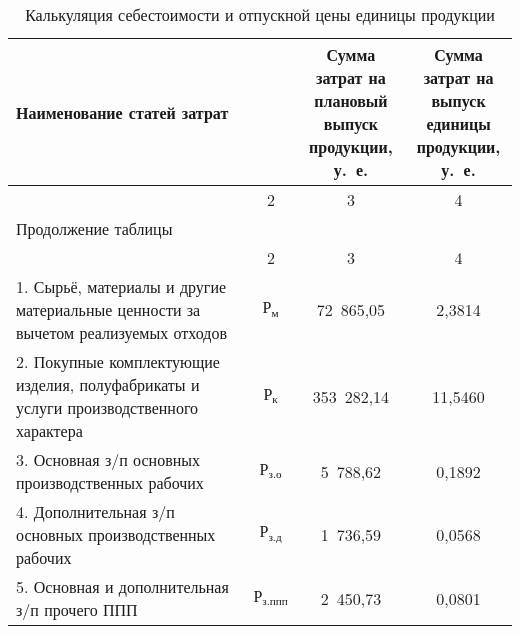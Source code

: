 {\small
\begin{longtable}{| m{10.5cm} | c | c | c |}
  \caption{
    Калькуляция себестоимости и отпускной цены единицы продукции
  }\label{tbl:calculation} \\
      \hline
      \centering Наименование статей затрат
      & \rotatebox[origin=c]{90}{\parbox{3.5cm}{Условное обозначение}}
      & \rotatebox[origin=c]{90}{
        \parbox{4.0cm}{
          Сумма затрат на \\ плановый выпуск \\ продукции, у.~е.
        }
      }
      & \rotatebox[origin=c]{90}{
        \parbox{3.5cm}{
          Сумма затрат на \\ выпуск единицы \\ продукции, у.~е.
        }
      } \\

      \hline
      \centering 1 & 2 & 3 & 4 \\
      \hline
      \endfirsthead

      \multicolumn{4}{l}{\normalsize Продолжение таблицы \thetable{}} \\
      \hline
      \centering 1 & 2 & 3 & 4 \\
      \hline
      \endhead

      1. Сырьё, материалы и другие материальные ценности \newline
      за вычетом реализуемых отходов
      & \( \text{Р}_{\text{м}} \) & 72~865,05 & 2,3814 \\
      \hline

      2. Покупные комплектующие изделия, полуфабрикаты и \newline
      услуги производственного характера
      & \( \text{Р}_{\text{к}} \) & 353~282,14 & 11,5460 \\
      \hline

      3. Основная з/п основных производственных рабочих
      & \( \text{Р}_{\text{з.о}} \) & 5~788,62 & 0,1892 \\
      \hline

      4. Дополнительная з/п основных производственных \newline рабочих
      & \( \text{Р}_{\text{з.д}} \) & 1~736,59 & 0,0568 \\
      \hline

      5. Основная и дополнительная з/п прочего ППП
      & \( \text{Р}_{\text{з.ппп}} \) & 2~450{,}73 & 0,0801 \\
      \hline


\end{longtable}}
